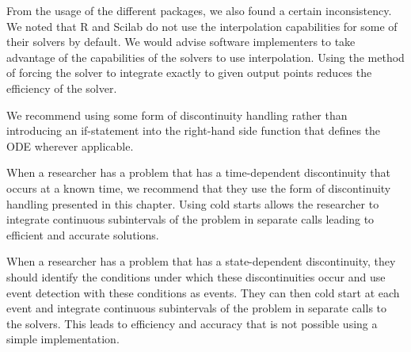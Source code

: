 From the usage of the different packages, we also found a certain inconsistency. We noted that R and Scilab do not use the interpolation capabilities for some of their solvers by default. We would advise software implementers to take advantage of the capabilities of the solvers to use interpolation. Using the method of forcing the solver to integrate exactly to given output points reduces the efficiency of the solver.

We recommend using some form of discontinuity handling rather than introducing an if-statement into the right-hand side function that defines the ODE wherever applicable.

When a researcher has a problem that has a time-dependent discontinuity that occurs at a known time, we recommend that they use the form of discontinuity handling presented in this chapter. Using cold starts allows the researcher to integrate continuous subintervals of the problem in separate calls leading to efficient and accurate solutions.

When a researcher has a problem that has a state-dependent discontinuity, they should identify the conditions under which these discontinuities occur and use event detection with these conditions as events. They can then cold start at each event and integrate continuous subintervals of the problem in separate calls to the solvers. This leads to efficiency and accuracy that is not possible using a simple implementation. 


%


